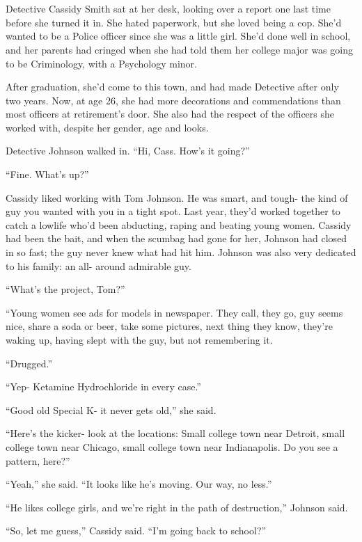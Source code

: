 \chapter{~}
Detective Cassidy Smith sat at her desk, looking over a report one last time before she
turned it in. She hated paperwork, but she loved being a cop. She'd wanted to be a Police
officer since she was a little girl. She'd done well in school, and her parents had cringed when
she had told them her college major was going to be Criminology, with a Psychology minor.

After graduation, she'd come to this town, and had made Detective after only two years. Now,
at age 26, she had more decorations and commendations than most officers at retirement's door.
She also had the respect of the officers she worked with, despite her gender, age and looks.

Detective Johnson walked in. ``Hi, Cass. How's it going?''

``Fine. What's up?''

Cassidy liked working with Tom Johnson. He was smart, and tough- the kind of guy you wanted
with you in a tight spot. Last year, they'd worked together to catch a lowlife who'd been
abducting, raping and beating young women. Cassidy had been the bait, and when the scumbag had
gone for her, Johnson had closed in so fast; the guy never knew what had hit him. Johnson was
also very dedicated to his family: an all- around admirable guy.

``What's the project, Tom?''

``Young women see ads for models in newspaper. They call, they go, guy seems nice, share a
soda or beer, take some pictures, next thing they know, they're waking up, having slept with the
guy, but not remembering it.

``Drugged.''

``Yep- Ketamine Hydrochloride in every case.''

``Good old Special K- it never gets old,'' she said.

``Here's the kicker- look at the locations: Small college town near Detroit, small college
town near Chicago, small college town near Indianapolis. Do you see a pattern, here?''

``Yeah,'' she said. ``It looks like he's moving. Our way, no less.''

``He likes college girls, and we're right in the path of destruction,'' Johnson said.

``So, let me guess,'' Cassidy said. ``I'm going back to school?''

